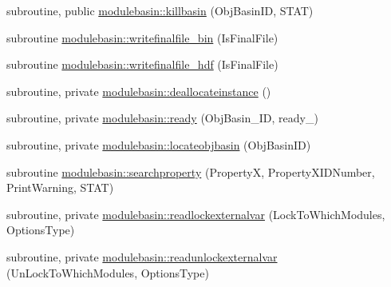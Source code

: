 \begin{DoxyCompactItemize}
\item 
subroutine, public \mbox{\hyperlink{namespacemodulebasin_a766c9c7d623f8a8392b3ed324921f71c}{modulebasin\+::killbasin}} (Obj\+Basin\+ID, S\+T\+AT)
\item 
subroutine \mbox{\hyperlink{namespacemodulebasin_ab2ed3d304db416a0172609e73be05bd4}{modulebasin\+::writefinalfile\+\_\+bin}} (Is\+Final\+File)
\item 
subroutine \mbox{\hyperlink{namespacemodulebasin_af6daa86ceef2fea67fa23aaebaf588f1}{modulebasin\+::writefinalfile\+\_\+hdf}} (Is\+Final\+File)
\item 
subroutine, private \mbox{\hyperlink{namespacemodulebasin_a1aae2d1fbf8f2ccffa519261e67515b3}{modulebasin\+::deallocateinstance}} ()
\item 
subroutine, private \mbox{\hyperlink{namespacemodulebasin_afed1d3ff36b21d7528bddef4df954906}{modulebasin\+::ready}} (Obj\+Basin\+\_\+\+ID, ready\+\_\+)
\item 
subroutine, private \mbox{\hyperlink{namespacemodulebasin_a44bb775ef055614008b8afd7ca4b77f4}{modulebasin\+::locateobjbasin}} (Obj\+Basin\+ID)
\item 
subroutine \mbox{\hyperlink{namespacemodulebasin_aa2e4e95b7bf5ee3e53a64d7f2269c946}{modulebasin\+::searchproperty}} (PropertyX, Property\+X\+I\+D\+Number, Print\+Warning, S\+T\+AT)
\item 
subroutine, private \mbox{\hyperlink{namespacemodulebasin_adebce1a3581c733f01c10813a94c4dea}{modulebasin\+::readlockexternalvar}} (Lock\+To\+Which\+Modules, Options\+Type)
\item 
subroutine, private \mbox{\hyperlink{namespacemodulebasin_aff09c4da760fd9cda4b797242d7ff522}{modulebasin\+::readunlockexternalvar}} (Un\+Lock\+To\+Which\+Modules, Options\+Type)
\end{DoxyCompactItemize}
